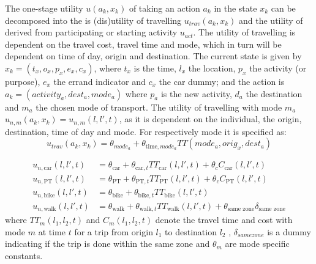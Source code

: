 The one-stage utility $u(a_k,x_k)$ of taking an action $a_k$ in the state $x_k$ can be decomposed into the is (dis)utility of travelling $u_{trav}(a_k,x_k)$ and the utility of derived from participating or starting activity $u_{act}$. The utility of travelling is dependent on the travel cost, travel time and mode, which in turn will be dependent on time of day, origin and destination. The current state is given by $x_k = (t_x,o_x,p_x,e_x,c_x)$, where $t_x$ is the time, $l_x$ the location, $p_x$ the activity (or purpose), $e_x$ the errand indicator and $c_x$ the car dummy; and the action is $a_k=(activity_a,dest_a,mode_a)$ where $p_a$ is the new activity, $d_a$ the destination and $m_a$ the chosen mode of transport. The utility of travelling with mode $m_a$  $u_{n,m}(a_k,x_k) = u_{n,m}(l,l',t)$, as it is dependent on the individual, the origin, destination, time of day and mode. For respectively mode it is specified as:
\newcommand{\car}{\text{car}}
\newcommand{\pt}{\text{PT}}
\newcommand{\walk}{\text{walk}}
\newcommand{\bike}{\text{bike}}
\newcommand{\dummy}[1]{\delta_{#1}}
\newcommand{\hi}{\text{h.i}}
\newcommand{\wait}{\text{wait}}
\newcommand{\geqfive}{\text{same zone}}
\newcommand{\mc}{\theta}
\newcommand{\ac}{c}
\newcommand{\dura}[1]{\Delta t_#1}
\newcommand{\TT}{TT}
\begin{equation}
    u_{trav}(a_k,x_k) = \mc_{{mode}_a} + \theta_{\text{time},{mode}_a} \TT({mode}_a,{orig}_x,{dest}_a)
\end{equation}

\begin{align*}
u_{n,\car}(l,l',t) &= \mc_\car + \theta_{\car,t} \TT_\car(l,l',t) + \theta_{c} C_\car(l,l',t) \\
u_{n,\pt}(l,l',t) &= \mc_\pt + \theta_{\pt,t} \TT_\pt(l,l',t) + \theta_{c}  C_\pt(l,l',t) \\
u_{n,\bike}(l,l',t) &= \mc_\bike + \theta_{\bike,t} \TT_\bike(l,l',t) \\
u_{n,\walk}(l,l',t) &= \mc_\walk + \theta_{\walk,t} \TT_\walk(l,l',t) + \theta_{\geqfive} \dummy{\geqfive}
\end{align*}
where $\TT_m(l_1,l_2,t)$ and $C_m(l_1,l_2,t)$ denote the travel time and cost with mode $m$ at time $t$ for a trip from origin $l_1$ to destination $l_2$ , $\dummy{same zone}$ is a dummy indicating if the trip is done within the same zone and $\mc_m$ are mode specific constants.

